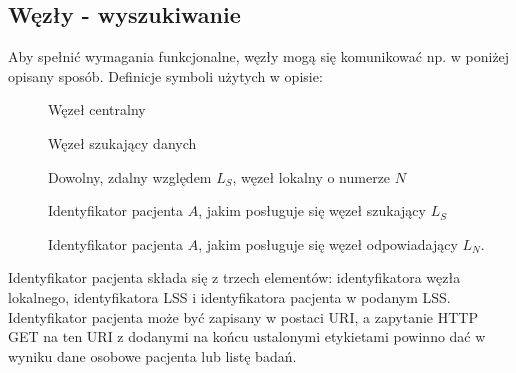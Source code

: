 \documentclass[a4paper]{report}
\begin{document}
\subsection{Węzły - wyszukiwanie}

Aby spełnić wymagania funkcjonalne, węzły mogą się komunikować np. w poniżej opisany sposób.
Definicje symboli użytych w opisie:
\begin{description}
  \item[] Węzeł centralny
  \item[] Węzeł szukający danych
  \item[] Dowolny, zdalny względem $L_S$, węzeł lokalny o numerze $N$
  \item[] Identyfikator pacjenta $A$, jakim posługuje się węzeł szukający $L_S$
  \item[] Identyfikator pacjenta $A$, jakim posługuje się węzeł odpowiadający $L_N$.
\end{description}

Identyfikator pacjenta składa się z trzech elementów: identyfikatora węzła lokalnego, identyfikatora LSS i identyfikatora
pacjenta w podanym LSS. Identyfikator pacjenta może być zapisany w postaci URI, a zapytanie HTTP GET na
ten URI z dodanymi na końcu ustalonymi etykietami powinno dać w wyniku dane osobowe pacjenta lub listę badań.
  
\end{document}
